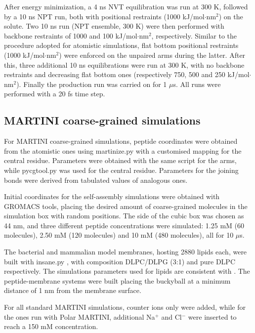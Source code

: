 After energy minimization, a 4 ns NVT equilibration was run at 300 K, followed by a 10 ns NPT run, both with positional restraints (1000 kJ/mol$\cdot$nm$^2$) on the solute. Two 10 ns run (NPT ensemble, 300 K) were then performed with backbone restraints of 1000 and 100 kJ/mol$\cdot$nm$^2$, respectively. Similar to the procedure adopted for atomistic simulations, flat bottom positional restraints (1000 kJ/mol$\cdot$nm$^2$) were enforced on the unpaired arms during the latter. After this, three additional 10 ns equilibrations were run at 300 K, with no backbone restraints and decreasing flat bottom ones (respectively 750, 500 and 250 kJ/mol$\cdot$nm$^2$). Finally the production run was carried on for 1 $\mu$s. All runs were performed with a 20 fs time step.

\subsection{MARTINI coarse-grained simulations} \label{sec:MARTINI_sim_det}
For MARTINI \citep{Marrink2007, Monticelli2008} coarse-grained simulations, peptide coordinates were obtained from the atomistic ones using martinize.py \citep{DeJong2013} with a customised mapping for the central residue. Parameters were obtained with the same script for the arms, while pycgtool.py \citep{Graham2017} was used for the central residue. Parameters for the joining bonds were derived from tabulated values of analogous ones.

Initial coordinates for the self-assembly simulations were obtained with GROMACS tools, placing the desired amount of coarse-grained molecules in the simulation box with random positions.
%
The side of the cubic box was chosen as 44 nm, and three different peptide concentrations were simulated: 1.25 mM (60 molecules), 2.50 mM (120 molecules) and 10 mM (480 molecules), all for 10 $\mu$s.

The bacterial and mammalian model membranes, hosting 2880 lipids each, were built with insane.py \citep{Wassenaar2015}, with composition DLPC/DLPG (3:1) and pure DLPC respectively. The simulations parameters used for lipids are consistent with \citet{SiewertJ.Marrink2003}. The peptide-membrane systems were built placing the buckyball at a minimum distance of 1 nm from the membrane surface.

For all standard MARTINI simulations, counter ions only were added, while for the ones run with Polar MARTINI, additional Na$^+$ and Cl$^-$ were inserted to reach a 150 mM concentration.

